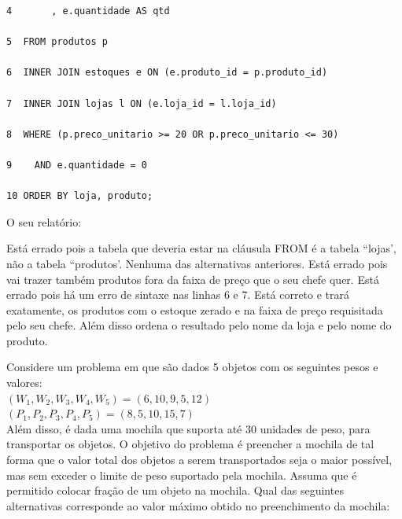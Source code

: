 \documentclass[12pt, addpoints]{exam}
\begin{document}
\begin{questions}
\begin{tcolorbox}
\begin{verbatim}
4       , e.quantidade AS qtd

5  FROM produtos p

6  INNER JOIN estoques e ON (e.produto_id = p.produto_id)

7  INNER JOIN lojas l ON (e.loja_id = l.loja_id)

8  WHERE (p.preco_unitario >= 20 OR p.preco_unitario <= 30)

9    AND e.quantidade = 0

10 ORDER BY loja, produto;

 \end{verbatim}

\end{tcolorbox}

O seu relatório:
\begin{choices}
\choice Está errado pois a tabela que deveria estar na cláusula FROM é a tabela ``lojas', não a tabela ``produtos'.
\choice Nenhuma das alternativas anteriores.
\choice Está errado pois vai trazer também produtos fora da faixa de preço que o seu chefe quer.
\choice Está errado pois há um erro de sintaxe nas linhas 6 e 7.
\choice Está correto e trará exatamente, os produtos com o estoque zerado e na faixa de preço requisitada pelo seu chefe. Além disso ordena o resultado pelo nome da loja e pelo nome do produto.
\end{choices}

\question

Considere um problema em que são dados 5 objetos com os seguintes pesos e valores:\\

 $(W_1, W_2, W_3, W_4, W_5) = (6, 10, 9, 5, 12)$\\

 $(P_1, P_2, P_3, P_4, P_5) = (8, 5, 10, 15, 7)$\\

Além disso, é dada uma mochila que suporta até 30 unidades de peso, para transportar os objetos. O objetivo do problema é preencher a mochila de tal forma que o valor total dos objetos a serem transportados seja o maior possível, mas sem exceder o limite de peso suportado pela mochila. Assuma que é permitido colocar fração de um objeto na mochila. Qual das seguintes alternativas corresponde ao valor máximo obtido no preenchimento da mochila:
\begin{choices}
\end{choices}


\end{questions}
\end{document}
